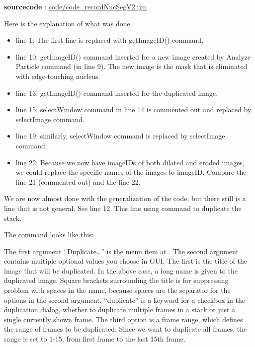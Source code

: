 \textbf{sourcecode} : \href{https://github.com/miura/BIAS_Nucleus_Segmentation/blob/struct_authorea/code_recordNucSegV2.ijm}{code/code\_recordNucSegV2.ijm}

Here is the explanation of what was done.

\begin{itemize}
  \item line 1: The first line is replaced with getImageID() command. 
  \item line 10: getImageID() command inserted for a new image created by Analyze Particle command (in line 9). The new image is the mask that is eliminated with edge-touching nucleus. 
  \item line 13: getImageID() command inserted for the duplicated image. 
  \item line 15: selectWindow command in line 14 is commented out and replaced by selectImage command. 
  \item line 19: similarly, selectWindow command is replaced by selectImage command. 
  \item line 22: Because we now have imageIDs of both dilated and eroded images, we could replace the specific names of the images to imageID. Compare the line 21 (commented out) and the line 22. 

\end{itemize}

We are now almost done with the generalization of the code, but there still is a line that is not general. See line 12. This line using  command to duplicate the stack.

The command looks like this:


The first argument ``Duplicate\ldots'' is the menu item at . The second argument contains multiple optional values you choose in GUI. The first is the title of the image that will be duplicated. In the above case, a long name is given to the duplicated image. Square brackets surrounding the title is for suppressing problem with spaces in the name, because spaces are the separator for the options in the second argument. ``duplicate'' is a keyword for a checkbox in the duplication dialog, whether to duplicate multiple frames in a stack or just a single currently shown frame. The third option is a frame range, which defines the range of frames to be duplicated. Since we want to duplicate all frames, the range is set to 1-15, from first frame to the last 15th frame.

